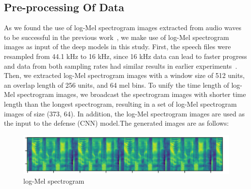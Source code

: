 \subsection{Pre-processing Of Data}
As we found the use of log-Mel spectrogram images extracted from audio waves to be successful in the previous work~\cite{ren2018attention}, we make use of log-Mel spectrogram images as input of the deep models in this study.  First, the speech files were resampled from 44.1 kHz to 16 kHz, since 16 kHz data can lead to faster progress and data from both sampling rates had similar results in earlier experiments~\cite{9054087}. Then, we extracted log-Mel spectrogram images with a window size of 512 units, an overlap length of 256 units, and 64 mel bins. To unify the time length of log-Mel spectrogram images, we broadcast the spectrogram images with shorter time length than the longest spectrogram, resulting in a set of log-Mel spectrogram images of size (373, 64). In addition, the log-Mel spectrogram images are used as the input to the defense (CNN) model.The generated images are as follows:
\begin{figure}[!hbtp]
	\centering
	\includegraphics[width=0.9\linewidth]{figures_ning/mel-1}
	\caption[log-Mel spectrogram]{log-Mel spectrogram}
	\label{fig:mel-1}
\end{figure}

